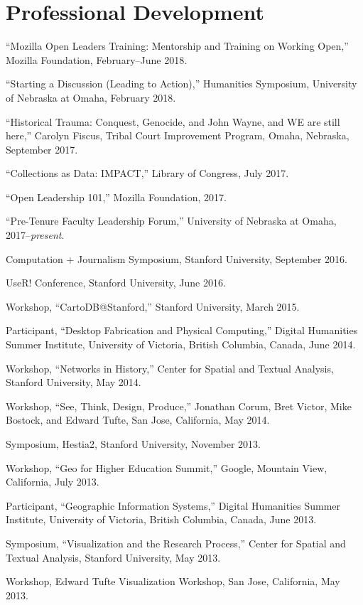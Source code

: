 \section{Professional Development}\label{professional-development}

``Mozilla Open Leaders Training: Mentorship and Training on Working
Open,'' Mozilla Foundation, February--June 2018.

``Starting a Discussion (Leading to Action),'' Humanities Symposium,
University of Nebraska at Omaha, February 2018.

``Historical Trauma: Conquest, Genocide, and John Wayne, and WE are
still here,'' Carolyn Fiscus, Tribal Court Improvement Program, Omaha,
Nebraska, September 2017.

``Collections as Data: IMPACT,'' Library of Congress, July 2017.

``Open Leadership 101,'' Mozilla Foundation, 2017.

``Pre-Tenure Faculty Leadership Forum,'' University of Nebraska at
Omaha, 2017--\emph{present}.

Computation + Journalism Symposium, Stanford University, September 2016.

UseR! Conference, Stanford University, June 2016.

Workshop, ``CartoDB@Stanford,'' Stanford University, March 2015.

Participant, ``Desktop Fabrication and Physical Computing,'' Digital
Humanities Summer Institute, University of Victoria, British Columbia,
Canada, June 2014.

Workshop, ``Networks in History,'' Center for Spatial and Textual
Analysis, Stanford University, May 2014.

Workshop, ``See, Think, Design, Produce,'' Jonathan Corum, Bret Victor,
Mike Bostock, and Edward Tufte, San Jose, California, May 2014.

Symposium, Hestia2, Stanford University, November 2013.

Workshop, ``Geo for Higher Education Summit,'' Google, Mountain View,
California, July 2013.

Participant, ``Geographic Information Systems,'' Digital Humanities
Summer Institute, University of Victoria, British Columbia, Canada, June
2013.

Symposium, ``Visualization and the Research Process,'' Center for
Spatial and Textual Analysis, Stanford University, May 2013.

Workshop, Edward Tufte Visualization Workshop, San Jose, California, May
2013.


